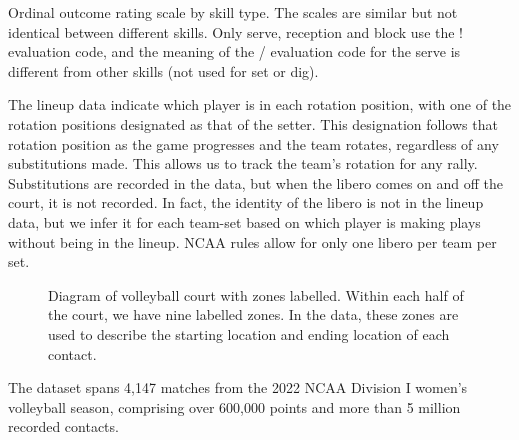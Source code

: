 \documentclass[USenglish]{article}
\theoremstyle{dgthm}
\theoremstyle{dgdef}
\begin{document}
\begin{table}
    \centering
    
    \caption{
      Ordinal outcome rating scale by skill type. The scales are similar but not identical between different skills. Only serve, reception and block use the ! evaluation code, and the meaning of the / evaluation code for the serve is different from other skills (not used for set or dig).
    }
    \label{tab:evaluation-codes}
\end{table}

The lineup data indicate which player is in each rotation position, with one of the rotation positions designated as that of the setter. This designation follows that rotation position as the game progresses and the team rotates, regardless of any substitutions made. This allows us to track the team's rotation for any rally. Substitutions are recorded in the data, but when the libero comes on and off the court, it is not recorded. In fact, the identity of the libero is not in the lineup data, but we infer it for each team-set based on which player is making plays without being in the lineup. NCAA rules allow for only one libero per team per set.

\begin{figure}
    \centering
    \caption{Diagram of volleyball court with zones labelled. Within each half of the court, we have nine labelled zones. In the data, these zones are used to describe the starting location and ending location of each contact.}
    \label{fig:volleyball-court-diagram}
\end{figure}

The dataset spans 4,147 matches from the 2022 NCAA Division I women's volleyball season, comprising over 600,000 points and more than 5 million recorded contacts.
\end{document}
